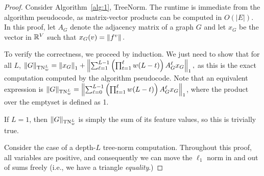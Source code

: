 \algorithm*
\begin{proof} Consider Algorithm~\ref{alg:1}, TreeNorm. The runtime is immediate from the algorithm pseudocode, as matrix-vector products can be computed in $O(|E|)$. In this proof, let $A_G$ denote the adjacency matrix of a graph $G$ and let $x_G$ be the vector in $\mathbb R^{V}$ such that $x_G(v) = \left\lVert f^v\right\rVert.$

To verify the correctness, we proceed by induction. We just need to show that for all $L$, $\Vert G \Vert_{\textnormal{TN}_w^L} = \left\lVert x_G\right\rVert_1 + \left\lVert\sum_{\ell=1}^{L-1} \left(\prod_{t=1}^{\ell} w(L-t) \right ) A_G^{\ell} {x}_{G}\right\rVert_1, $ as this is the exact computation computed by the algorithm pseudocode. Note that an equivalent expression is
$\Vert G \Vert_{\textnormal{TN}_w^L} = \left\lVert\sum_{\ell=0}^{L-1} \left(\prod_{t=1}^{\ell} w(L-t) \right ) A_G^{\ell} {x}_{G}\right\rVert_1$, where the product over the emptyset is defined as 1. 


If $L = 1$, then $\Vert G \Vert_{\textnormal{TN}_w^L}$ is simply the sum of its feature values, so this is trivially true. 

Consider the case of a depth-$L$ tree-norm computation. Throughout this proof, all variables are positive, and consequently we can move the $\ell_1$ norm in and out of sums freely (i.e., we have a triangle \emph{equality}.)


\end{proof}
